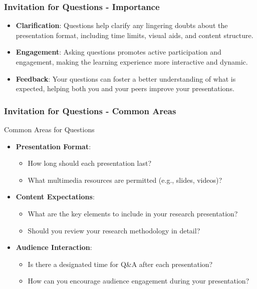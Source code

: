 \documentclass[aspectratio=169]{beamer}
\begin{document}
\begin{frame}[fragile]
    \frametitle{Invitation for Questions - Importance}
    \begin{itemize}
        \item \textbf{Clarification}: Questions help clarify any lingering doubts about the presentation format, including time limits, visual aids, and content structure.
        
        \item \textbf{Engagement}: Asking questions promotes active participation and engagement, making the learning experience more interactive and dynamic.
        
        \item \textbf{Feedback}: Your questions can foster a better understanding of what is expected, helping both you and your peers improve your presentations.
    \end{itemize}
\end{frame}

\begin{frame}[fragile]
    \frametitle{Invitation for Questions - Common Areas}
    \begin{block}{Common Areas for Questions}
        \begin{itemize}
            \item \textbf{Presentation Format}:
            \begin{itemize}
                \item How long should each presentation last?
                \item What multimedia resources are permitted (e.g., slides, videos)?
            \end{itemize}
            
            \item \textbf{Content Expectations}:
            \begin{itemize}
                \item What are the key elements to include in your research presentation?
                \item Should you review your research methodology in detail?
            \end{itemize}
            
            \item \textbf{Audience Interaction}:
            \begin{itemize}
                \item Is there a designated time for Q\&A after each presentation?
                \item How can you encourage audience engagement during your presentation?
            \end{itemize}
        \end{itemize}
    \end{block}
\end{frame}
\end{document}
